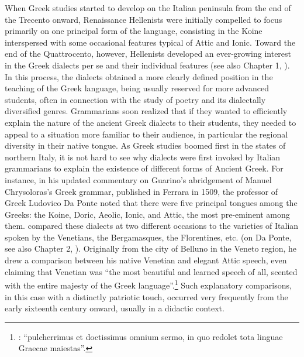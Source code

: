 When Greek studies started to develop on the Italian peninsula from the end of the Trecento onward, Renaissance Hellenists were initially compelled to focus primarily on one principal form of the language, consisting in the Koine interspersed with some occasional features typical of Attic and Ionic. Toward the end of the Quattrocento, however, Hellenists developed an ever-growing interest in the Greek dialects per se and their individual features (see also Chapter 1, ). In this process, the dialects obtained a more clearly defined position in the teaching of the Greek language, being usually reserved for more advanced students, often in connection with the study of poetry and its dialectally diversified genres. Grammarians soon realized that if they wanted to efficiently explain the nature of the ancient Greek dialects to their students, they needed to appeal to a situation more familiar to their audience, in particular the regional diversity in their native  tongue. As Greek studies boomed first in the states of northern Italy, it is not hard to see why  dialects were first invoked by Italian grammarians to explain the existence of different forms of Ancient Greek. For instance, in his updated commentary on Guarino’s abridgement of Manuel Chrysoloras’s Greek grammar, published in Ferrara in 1509, the professor of Greek Ludovico Da Ponte noted that there were five principal tongues among the Greeks: the Koine, Doric, Aeolic, Ionic, and Attic, the most pre-eminent among them.  compared these dialects at two different occasions to the varieties of Italian spoken by the Venetians, the Bergamasques, the Florentines, etc. (on Da Ponte, see also Chapter 2, ). Originally from the city of Belluno in the Veneto region, he drew a comparison between his native Venetian and elegant Attic speech, even claiming that Venetian was “the most beautiful and learned speech of all, scented with the entire majesty of the Greek language”.\footnote{: “pulcherrimus et doctissimus omnium sermo, in quo redolet tota linguae Graecae maiestas”.} Such explanatory comparisons, in this case with a distinctly patriotic touch, occurred very frequently from the early sixteenth century onward, usually in a didactic context.

